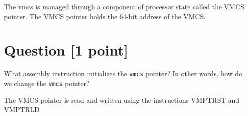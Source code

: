 \documentclass[11pt]{article}
\begin{document}
\begin{solution}
The vmcs is managed through a component of processor state called the VMCS pointer. The VMCS pointer holds the 64-bit address of the VMCS.
\end{solution}


\section{Question [1 point]}

What assembly instruction initializes the \texttt{vmcs} pointer? In other words, how do we change the \texttt{vmcs} pointer?

\begin{solution}
The VMCS pointer is read and written using the instructions VMPTRST and VMPTRLD\end{solution}
\end{document}
